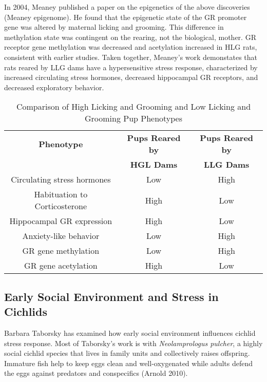 \documentclass[12pt,twoside]{reedthesis}
\begin{document}
In 2004, Meaney
published a paper on the epigenetics of the above discoveries (Meaney epigenome). He found that the
epigenetic state of the GR promoter gene was altered by maternal licking and
grooming. This difference in methylation state was contingent on the rearing,
not the biological, mother.  GR receptor gene methylation was decreased and
acetylation increased in HLG rats, consistent with earlier studies. Taken
together, Meaney's work demonstates that rats reared by LLG dams have a
hypersensitive stress response, characterized by increased circulating stress
hormones, decreased hippocampal GR receptors, and decreased exploratory
behavior. 

\begin{table}[htbp]
\caption[Comparison of High Licking and Grooming and Low Licking and Grooming
Pup Phenotypes]{Comparison of High Licking and Grooming and Low Licking and Grooming
Pup Phenotypes}
\begin{center}
\footnotesize
\begin{tabular}{ | c | c | c | }
  \hline
  \textbf{Phenotype} & \textbf{Pups Reared by} & \textbf{Pups Reared by} \\
  & \textbf{HGL Dams} & \textbf{LLG Dams} \\
\hline
 Circulating stress hormones & Low & High\\
\hline
 Habituation to Corticosterone  & High & Low\\
\hline
  Hippocampal GR expression & High & Low\\
\hline
  Anxiety-like behavior & Low & High\\
\hline
  GR gene methylation & Low & High \\
\hline
  GR gene acetylation & High & Low \\
  \hline
\end{tabular}
\end{center}
\end{table}

 \subsection{Early Social Environment and Stress in Cichlids}

Barbara Taborsky has examined how early social environment influences cichlid
stress response.
Most of Taborsky's work is with \textit{Neolamprologus pulcher}, a highly social cichlid species
that lives in family units and collectively raises offspring. Immature fish help
to keep eggs clean and well-oxygenated while adults defend the eggs against
predators and conspecifics (Arnold 2010).
\end{document}
